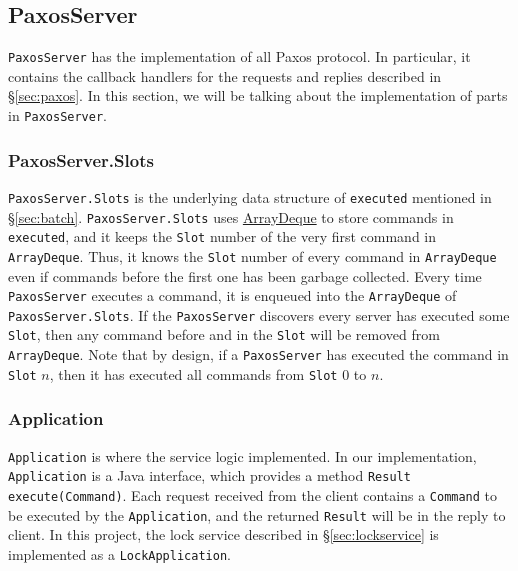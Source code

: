 \documentclass{article}
\numberwithin{equation}{section}
\begin{document}
\subsection{PaxosServer}
\verb|PaxosServer| has the implementation of all Paxos protocol. In particular, it contains the callback handlers for the requests and replies described in \S\ref{sec:paxos}. In this section, we will be talking about the implementation of parts in \verb|PaxosServer|.

\subsubsection{PaxosServer.Slots}
\verb|PaxosServer.Slots| is the underlying data structure of \verb|executed| mentioned in \S\ref{sec:batch}. \verb|PaxosServer.Slots| uses \href{https://docs.oracle.com/javase/8/docs/api/java/util/ArrayDeque.html}{ArrayDeque} to store commands in \verb|executed|, and it keeps the \verb|Slot| number of the very first command in \verb|ArrayDeque|. Thus, it knows the \verb|Slot| number of every command in \verb|ArrayDeque| even if commands before the first one has been garbage collected. Every time \verb|PaxosServer| executes a command, it is enqueued into the \verb|ArrayDeque| of \verb|PaxosServer.Slots|. If the \verb|PaxosServer| discovers every server has executed some \verb|Slot|, then any command before and in the \verb|Slot| will be removed from \verb|ArrayDeque|. Note that by design, if a \verb|PaxosServer| has executed the command in \verb|Slot| $n$, then it has executed all commands from \verb|Slot| $0$ to $n$.

\subsubsection{Application}
\verb|Application| is where the service logic implemented. In our implementation, \verb|Application| is a Java interface, which provides a method \verb|Result execute(Command)|. Each request received from the client contains a \verb|Command| to be executed by the \verb|Application|, and the returned \verb|Result| will be in the reply to client. In this project, the lock service described in \S\ref{sec:lockservice} is implemented as a \verb|LockApplication|.
\end{document}

